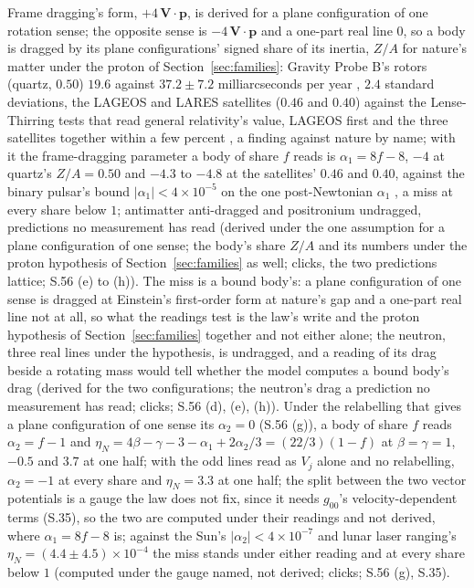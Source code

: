 \documentclass[pdflatex,sn-mathphys-num]{sn-jnl}
\theoremstyle{thmstyleone}
\theoremstyle{thmstyletwo}
\begin{document}
Frame dragging's form, $+4\,\mathbf V\cdot\mathbf p$, is derived for a plane configuration of one rotation sense; the opposite sense is $-4\,\mathbf V\cdot\mathbf p$ and a one-part real line $0$, so a body is dragged by its plane configurations' signed share of its inertia, $Z / A$ for nature's matter under the proton of Section~\ref{sec:families}: Gravity Probe B's rotors (quartz, $0.50$) $19.6$ against $37.2 \pm 7.2$ milliarcseconds per year \cite{everitt}, $2.4$ standard deviations, the LAGEOS and LARES satellites ($0.46$ and $0.40$) against the Lense-Thirring tests that read general relativity's value, LAGEOS first \cite{ciufolini} and the three satellites together within a few percent \cite{ciufolini2019}, a finding against nature by name; with it the frame-dragging parameter a body of share $f$ reads is $\alpha_1 = 8f - 8$, $-4$ at quartz's $Z / A = 0.50$ and $-4.3$ to $-4.8$ at the satellites' $0.46$ and $0.40$, against the binary pulsar's bound $|\alpha_1| < 4 \times 10^{-5}$ on the one post-Newtonian $\alpha_1$ \cite{shao}, a miss at every share below $1$; antimatter anti-dragged and positronium undragged, predictions no measurement has read (derived under the one assumption for a plane configuration of one sense; the body's share $Z / A$ and its numbers under the proton hypothesis of Section~\ref{sec:families} as well; clicks, the two predictions lattice; S.56 (e) to (h)). The miss is a bound body's: a plane configuration of one sense is dragged at Einstein's first-order form at nature's gap and a one-part real line not at all, so what the readings test is the law's write and the proton hypothesis of Section~\ref{sec:families} together and not either alone; the neutron, three real lines under the hypothesis, is undragged, and a reading of its drag beside a rotating mass would tell whether the model computes a bound body's drag (derived for the two configurations; the neutron's drag a prediction no measurement has read; clicks; S.56 (d), (e), (h)). Under the relabelling that gives a plane configuration of one sense its $\alpha_2 = 0$ (S.56 (g)), a body of share $f$ reads $\alpha_2 = f - 1$ and $\eta_N = 4\beta - \gamma - 3 - \alpha_1 + 2\alpha_2 / 3 = (22 / 3)(1 - f)$ at $\beta = \gamma = 1$, $-0.5$ and $3.7$ at one half; with the odd lines read as $V_j$ alone and no relabelling, $\alpha_2 = -1$ at every share and $\eta_N = 3.3$ at one half; the split between the two vector potentials is a gauge the law does not fix, since it needs $g_{00}$'s velocity-dependent terms (S.35), so the two are computed under their readings and not derived, where $\alpha_1 = 8f - 8$ is; against the Sun's $|\alpha_2| < 4 \times 10^{-7}$ \cite{nordtvedt} and lunar laser ranging's $\eta_N = (4.4 \pm 4.5) \times 10^{-4}$ \cite{will} the miss stands under either reading and at every share below $1$ (computed under the gauge named, not derived; clicks; S.56 (g), S.35).
\end{document}
